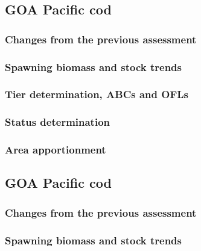 \documentclass[]{tufte-handout}
\begin{document}
\hypertarget{goa-pacific-cod}{%
\subsection{GOA Pacific cod}\label{goa-pacific-cod}}

\hypertarget{changes-from-the-previous-assessment-1}{%
\subsubsection{Changes from the previous
assessment}\label{changes-from-the-previous-assessment-1}}

\hypertarget{spawning-biomass-and-stock-trends-1}{%
\subsubsection{Spawning biomass and stock
trends}\label{spawning-biomass-and-stock-trends-1}}

\hypertarget{tier-determination-abcs-and-ofls}{%
\subsubsection{Tier determination, ABCs and
OFLs}\label{tier-determination-abcs-and-ofls}}

\hypertarget{status-determination-1}{%
\subsubsection{Status determination}\label{status-determination-1}}

\hypertarget{area-apportionment-1}{%
\subsubsection{Area apportionment}\label{area-apportionment-1}}

\hypertarget{goa-pacific-cod-1}{%
\subsection{GOA Pacific cod}\label{goa-pacific-cod-1}}

\hypertarget{changes-from-the-previous-assessment-2}{%
\subsubsection{Changes from the previous
assessment}\label{changes-from-the-previous-assessment-2}}

\hypertarget{spawning-biomass-and-stock-trends-2}{%
\subsubsection{Spawning biomass and stock
trends}\label{spawning-biomass-and-stock-trends-2}}
\end{document}
